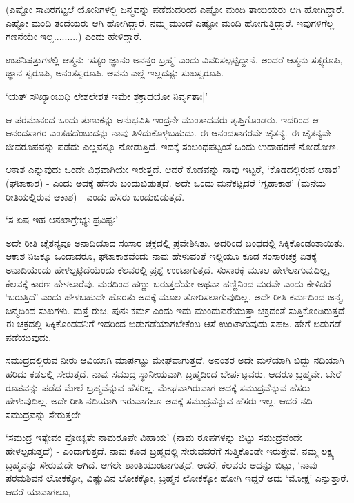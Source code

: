 (ಎಷ್ಟೋ ಸಾವಿರಗಟ್ಟಲೆ ಯೋನಿಗಳಲ್ಲಿ ಜನ್ಮವನ್ನು ಪಡೆದುದರಿಂದ ಎಷ್ಟೋ ಮಂದಿ ತಾಯಿಯರು ಆಗಿ ಹೋಗಿದ್ದಾರೆ. ಎಷ್ಟೋ ಮಂದಿ ತಂದೆಯರು ಆಗಿ ಹೋಗಿದ್ದಾರೆ. ನಮ್ಮ ಮುಂದೆ ಎಷ್ಟೋ ಮಂದಿ ಹೋಗುತ್ತಿದ್ದಾರೆ. ಇವುಗಳಿಗೆಲ್ಲ ಗಣನೆಯೇ ಇಲ್ಲ.........) ಎಂದು ಹೇಳಿದ್ದಾರೆ.

ಉಪನಿಷತ್ತುಗಳಲ್ಲಿ ಆತ್ಮನು `ಸತ್ಯಂ ಜ್ಞಾನಂ ಅನನ್ತಂ ಬ್ರಹ್ಮ' ಎಂದು ವಿವರಿಸಲ್ಪಟ್ಟಿದ್ದಾನೆ. ಅಂದರೆ ಆತ್ಮನು ಸತ್ಸ್ವರೂಪಿ, ಜ್ಞಾನ ಸ್ವರೂಪಿ, ಅನಂತಸ್ವರೂಪಿ. ಅವನು ಎಲ್ಲೆ ಇಲ್ಲದಷ್ಟು ಸುಖಸ್ವರೂಪಿ.

\begin{shloka}
`ಯತ್ ಸೌಖ್ಯಾಂಬುಧಿ ಲೇಶಲೇಶತ ಇಮೇ ಶಕ್ರಾದಯೋ ನಿರ್ವೃತಾಃ|'
\end{shloka}

ಆ ಪರಮಾನಂದ ಒಂದು ತುಣುಕನ್ನು ಅನುಭವಿಸಿ ಇಂದ್ರನೇ ಮುಂತಾದವರು ತೃಪ್ತಿಗೊಂಡರು. ಇದರಿಂದ ಆ ಆನಂದಸಾಗರ ಎಂತಹದೆಂಬುದನ್ನು ನಾವು ತಿಳಿದುಕೊಳ್ಳಬಹುದು. ಈ ಆನಂದಸಾಗರವೇ ಚೈತನ್ಯ. ಈ ಚೈತನ್ಯವೇ ಜೀವರೂಪವನ್ನು ಪಡೆದು ಎಲ್ಲವನ್ನೂ ನೋಡುತ್ತಿದೆ. ಇದಕ್ಕೆ ಸಂಬಂಧಪಟ್ಟಂತೆ ಒಂದು ಉದಾಹರಣೆ ನೋಡೋಣ.

ಆಕಾಶ ಎನ್ನುವುದು ಒಂದೇ ವಿಧವಾಗಿಯೇ ಇರುತ್ತದೆ. ಆದರೆ ಕೊಡವನ್ನು ನಾವು ಇಟ್ಟರೆ, `ಕೊಡದಲ್ಲಿರುವ ಆಕಾಶ' (ಘಟಾಕಾಶ) - ಎಂದು ಅದಕ್ಕೆ ಹೆಸರು ಬಂದುಬಿಡುತ್ತದೆ. ಅದೇ ಒಂದು ಮನೆಕಟ್ಟಿದರೆ `ಗೃಹಾಕಾಶ' (ಮನೆಯ ರೀತಿಯಲ್ಲಿರುವ ಆಕಾಶ) - ಎಂದು ಹೆಸರು ಬಂದುಬಿಡುತ್ತದೆ.

\begin{shloka}
`ಸ ಏಷ ಇಹ ಆನಖಾಗ್ರೇಭ್ಯಃ ಪ್ರವಿಷ್ಟಃ'
\end{shloka}

ಅದೇ ರೀತಿ ಚೈತನ್ಯವೂ ಅನಾದಿಯಾದ ಸಂಸಾರ ಚಕ್ರದಲ್ಲಿ ಪ್ರವೇಶಿಸಿತು. ಅದರಿಂದ ಬಂಧದಲ್ಲಿ ಸಿಕ್ಕಿಕೊಂಡಂತಾಯಿತು. ಆಕಾಶ ನಿಜಕ್ಕೂ ಒಂದಾದರೂ, ಘಟಾಕಾಶವೆಂದು ನಾವು ಹೇಳುವಂತೆ ಇಲ್ಲಿಯೂ ಕೂಡ ಸಂಸಾರಚಕ್ರ ಏತಕ್ಕೆ ಅನಾದಿಯೆಂದು ಹೇಳಲ್ಪಟ್ಟಿದೆಯೆಂದು ಕೆಲವರಲ್ಲಿ ಪ್ರಶ್ನೆ ಉಂಟಾಗುತ್ತದೆ. ಸಂಸಾರಕ್ಕೆ ಮೂಲ ಹೇಳಲಾಗುವುದಿಲ್ಲ, ಕೆಲವಕ್ಕೆ ಕಾರಣ ಹೇಳಲಾರೆವು. ಮರದಿಂದ ಹಣ್ಣು ಬರುತ್ತದೆಯೇ ಅಥವಾ ಹಣ್ಣಿನಿಂದ ಮರವೇ ಎಂದು ಕೇಳಿದರೆ `ಬರುತ್ತಿದೆ' ಎಂದು ಹೇಳಬಹುದೇ ಹೊರತು ಅದಕ್ಕೆ ಮೂಲ ತೋರಿಸಲಾಗುವುದಿಲ್ಲ. ಅದೇ ರೀತಿ ಕರ್ಮದಿಂದ ಜನ್ಮ, ಜನ್ಮದಿಂದ ಸುಖಗಳು. ಮತ್ತೆ ರುಚಿ, ಪುನಃ ಕರ್ಮ ಎಂದು ಇದು ಮುಂದುವರೆಯುತ್ತಾ ಚಕ್ರದಂತೆ ಸುತ್ತಿಕೊಂಡಿರುತ್ತದೆ. ಈ ಚಕ್ರದಲ್ಲಿ ಸಿಕ್ಕಿಕೊಂಡವನಿಗೆ ಇದರಿಂದ ಬಿಡುಗಡೆಯಾಗಬೇಕೆಂಬ ಆಸೆ ಉಂಟಾಗುವುದು ಸಹಜ. ಹೇಗೆ ಬಿಡುಗಡೆ ಪಡೆಯುವುದು.

ಸಮುದ್ರದಲ್ಲಿರುವ ನೀರು ಆವಿಯಾಗಿ ಮಾರ್ಪಟ್ಟು ಮೇಘವಾಗುತ್ತದೆ. ಅನಂತರ ಅದೇ ಮಳೆಯಾಗಿ ಬಿದ್ದು ನದಿಯಾಗಿ ಹರಿದು ಕಡಲಲ್ಲಿ ಸೇರುತ್ತದೆ. ನಾವು ಸಮುದ್ರ ಸ್ಥಾನೀಯವಾಗಿ ಬ್ರಹ್ಮದಿಂದ ಬೇರ್ಪಟ್ಟವರು. ಆದರೂ ಬ್ರಹ್ಮವೇ. ಬೇರೆ ರೂಪವನ್ನು ಪಡೆದ ಮೇಲೆ ಬ್ರಹ್ಮವೆನ್ನುವ ಹೆಸರಿಲ್ಲ. ಮೇಘವಾಗಿರುವಾಗ ಅದಕ್ಕೆ ಸಮುದ್ರವೆನ್ನುವ ಹೆಸರು ಹೇಳುವುದಿಲ್ಲ. ಅದೇ ರೀತಿ ನದಿಯಾಗಿ ಇರುವಾಗಲೂ ಅದಕ್ಕೆ ಸಮುದ್ರವೆನ್ನುವ ಹೆಸರು ಇಲ್ಲ. ಆದರೆ ನದಿ ಸಮುದ್ರವನ್ನು ಸೇರುತ್ತಲೇ 

`ಸಮುದ್ರ ಇತ್ಯೇವಂ ಪ್ರೋಚ್ಯತೇ ನಾಮರೂಪೇ ವಿಹಾಯ' (ನಾಮ ರೂಪಗಳನ್ನು ಬಿಟ್ಟು ಸಮುದ್ರವೆಂದೇ ಹೇಳಲ್ಪಡುತ್ತದೆ) - ಎಂದಾಗುತ್ತದೆ. ನಾವು ಕೂಡ ಬ್ರಹ್ಮದಲ್ಲಿ ಸೇರುವವರೆಗೆ ಸುತ್ತಿಕೊಂಡೇ ಇರುತ್ತೇವೆ. ನಮ್ಮ ಲಕ್ಷ್ಯ  ಬ್ರಹ್ಮವನ್ನು ಸೇರುವುದೇ ಆಗಿದೆ. ಆಗಲೇ ಶಾಂತಿಯುಂಟಾಗುತ್ತದೆ. ಆದರೆ, ಕೆಲವರು ಅದನ್ನು ಬಿಟ್ಟು, `ನಾವು ಪರಮಶಿವನ ಲೋಕಕ್ಕೋ, ವಿಷ್ಣುವಿನ ಲೋಕಕ್ಕೋ, ಬ್ರಹ್ಮನ ಲೋಕಕ್ಕೋ ಹೋಗಿ ಇದ್ದರೆ ಅದು `ಮೋಕ್ಷ' ಎನ್ನುತ್ತಾರೆ. ಆದರೆ ಯಾವಾಗಲೂ, 

